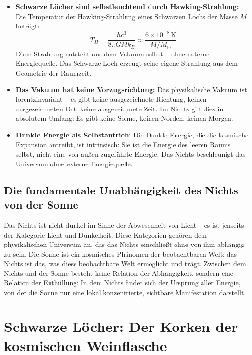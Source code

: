 ﻿\documentclass[12pt,a4paper]{report}
\begin{document}
\begin{itemize}
	\item \textbf{Schwarze Löcher sind selbstleuchtend durch Hawking-Strahlung:} Die Temperatur der Hawking-Strahlung eines Schwarzen Lochs der Masse $M$ beträgt:
	\begin{equation}
		T_H = \frac{\hbar c^3}{8\pi G M k_B} \approx \frac{6 \times 10^{-8}\,\text{K}}{M/M_\odot}
		\label{eq:hawking_temp}
	\end{equation}
	Diese Strahlung entsteht aus dem Vakuum selbst -- ohne externe Energiequelle. Das Schwarze Loch erzeugt seine eigene Strahlung aus dem Geometrie der Raumzeit.

	\item \textbf{Das Vakuum hat keine Vorzugsrichtung:} Das physikalische Vakuum ist lorentzinvariant -- es gibt keine ausgezeichnete Richtung, keinen ausgezeichneten Ort, keine ausgezeichnete Zeit. Im Nichts gilt dies in absolutem Umfang: Es gibt keine Sonne, keinen Norden, keinen Morgen.

	\item \textbf{Dunkle Energie als Selbstantrieb:} Die Dunkle Energie, die die kosmische Expansion antreibt, ist intrinsisch: Sie ist die Energie des leeren Raums selbst, nicht eine von außen zugeführte Energie. Das Nichts beschleunigt das Universum ohne externe Energiequelle.
\end{itemize}

\subsection{Die fundamentale Unabhängigkeit des Nichts von der Sonne}

Das Nichts ist nicht dunkel im Sinne der Abwesenheit von Licht -- es ist jenseits der Kategorie \glqq Licht\grqq{} und \glqq Dunkelheit\grqq{}. Diese Kategorien gehören dem physikalischen Universum an, das das Nichts einschließt ohne von ihm abhängig zu sein. Die Sonne ist ein kosmisches Phänomen der beobachtbaren Welt; das Nichts ist das, was diese beobachtbare Welt ermöglicht und trägt. Zwischen dem Nichts und der Sonne besteht keine Relation der Abhängigkeit, sondern eine Relation der Enthüllung: In dem Nichts findet sich der Ursprung aller Energie, von der die Sonne nur eine lokal konzentrierte, sichtbare Manifestation darstellt.

\section{Schwarze Löcher: Der Korken der kosmischen Weinflasche}
\end{document}
